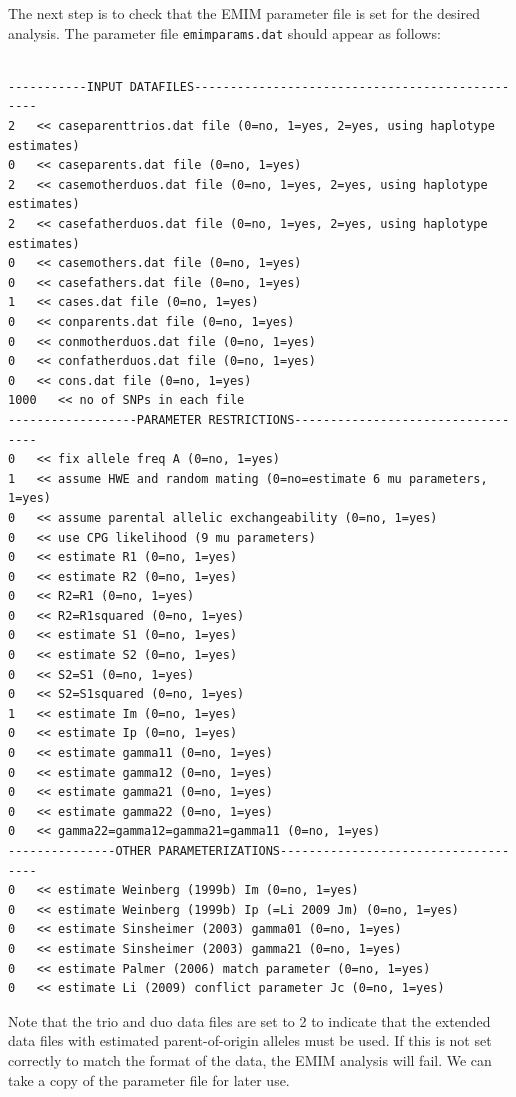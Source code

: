 \documentclass[a4paper,12pt]{article}
\newcommand{\code}[1]{{\footnotesize{{\tt #1}}}}
\begin{document}
The next step is to check that the EMIM parameter file is set for the desired analysis. The parameter file \code{emimparams.dat} should appear as follows: 
\vspace{0.35cm} \begin{lstlisting}

-----------INPUT DATAFILES------------------------------------------------
2   << caseparenttrios.dat file (0=no, 1=yes, 2=yes, using haplotype estimates)
0   << caseparents.dat file (0=no, 1=yes)
2   << casemotherduos.dat file (0=no, 1=yes, 2=yes, using haplotype estimates)
2   << casefatherduos.dat file (0=no, 1=yes, 2=yes, using haplotype estimates)
0   << casemothers.dat file (0=no, 1=yes)
0   << casefathers.dat file (0=no, 1=yes)
1   << cases.dat file (0=no, 1=yes)
0   << conparents.dat file (0=no, 1=yes)
0   << conmotherduos.dat file (0=no, 1=yes)
0   << confatherduos.dat file (0=no, 1=yes)
0   << cons.dat file (0=no, 1=yes)
1000   << no of SNPs in each file
------------------PARAMETER RESTRICTIONS----------------------------------
0   << fix allele freq A (0=no, 1=yes)
1   << assume HWE and random mating (0=no=estimate 6 mu parameters, 1=yes)
0   << assume parental allelic exchangeability (0=no, 1=yes)
0   << use CPG likelihood (9 mu parameters)
0   << estimate R1 (0=no, 1=yes)
0   << estimate R2 (0=no, 1=yes)
0   << R2=R1 (0=no, 1=yes)
0   << R2=R1squared	(0=no, 1=yes)
0   << estimate S1 (0=no, 1=yes)
0   << estimate S2 (0=no, 1=yes)
0   << S2=S1 (0=no, 1=yes)
0   << S2=S1squared	(0=no, 1=yes)
1   << estimate Im (0=no, 1=yes)
0   << estimate Ip (0=no, 1=yes)
0   << estimate gamma11 (0=no, 1=yes)
0   << estimate gamma12 (0=no, 1=yes)
0   << estimate gamma21 (0=no, 1=yes)
0   << estimate gamma22 (0=no, 1=yes)
0   << gamma22=gamma12=gamma21=gamma11 (0=no, 1=yes)
---------------OTHER PARAMETERIZATIONS------------------------------------
0   << estimate Weinberg (1999b) Im (0=no, 1=yes)
0   << estimate Weinberg (1999b) Ip (=Li 2009 Jm) (0=no, 1=yes)
0   << estimate Sinsheimer (2003) gamma01 (0=no, 1=yes)
0   << estimate Sinsheimer (2003) gamma21 (0=no, 1=yes)
0   << estimate Palmer (2006) match parameter (0=no, 1=yes)
0   << estimate Li (2009) conflict parameter Jc (0=no, 1=yes)

\end{lstlisting} \vspace{0.35cm}
Note that the trio and duo data files are set to 2 to indicate that the extended data files with estimated parent-of-origin alleles must be used. If this is not set correctly to match the format of the data, the EMIM analysis will fail. We can take a copy of the parameter file for later use. 
\end{document}
